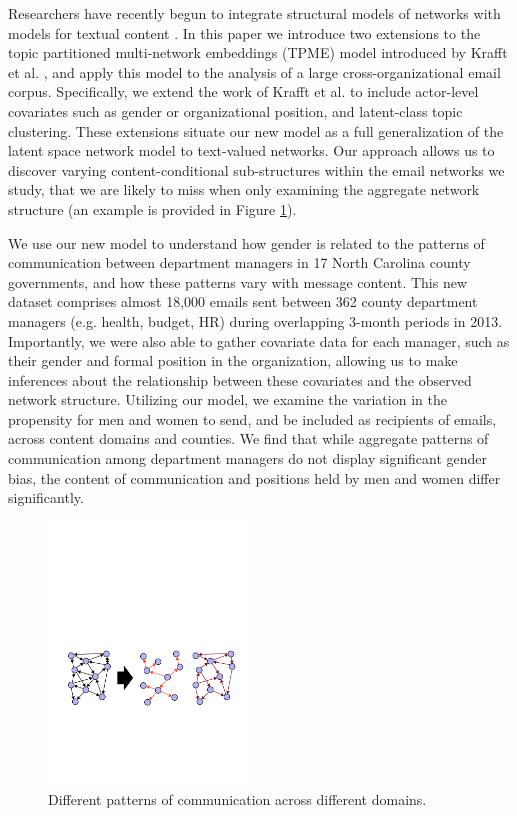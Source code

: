 \documentclass{pnastwo}
\begin{document}
\begin{article}
Researchers have recently begun to integrate structural models of networks with models for textual content \citep{McCallum2007,Krafft2012}. In this paper we introduce two extensions to the topic partitioned multi-network embeddings (TPME) model introduced by Krafft et al. \cite{Krafft2012}, and apply this model to the analysis of a large cross-organizational email corpus. Specifically, we extend the work of Krafft et al. to include actor-level covariates such as gender or organizational position, and latent-class topic clustering. These extensions situate our new model as a full generalization of the latent space network model \citep{Hoff2002a} to text-valued networks. Our approach allows us to discover varying content-conditional sub-structures within the email networks we study, that we are likely to miss when only examining the aggregate network structure (an example is provided in Figure \ref{fig:splitting}). 

We use our new model to understand how gender is related to the patterns of communication between department managers in 17 North Carolina county governments, and how these patterns vary with message content. This new dataset comprises almost 18,000 emails sent between 362 county department managers (e.g. health, budget, HR) during overlapping 3-month periods in 2013. Importantly, we were also able to gather covariate data for each manager, such as their gender and formal position in the organization, allowing us to make inferences about the relationship between these covariates and the observed network structure. Utilizing our model, we examine the variation in the propensity for men and women to send, and be included as recipients of emails, across content domains and counties. We find that while aggregate patterns of communication among department managers do not display significant gender bias, the content of communication and positions held by men and women differ significantly.


 \begin{figure}
\caption{\label{fig:splitting} Different patterns of communication across different domains.}	
\centering
\includegraphics[width = 0.48\textwidth]{images/Structure_Matters_Full.pdf}
\end{figure}



\end{article}
\end{document}
